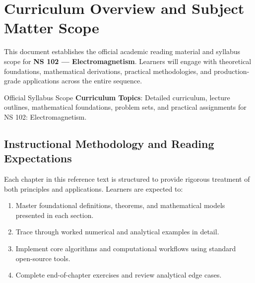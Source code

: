 \section{Curriculum Overview and Subject Matter Scope}

This document establishes the official academic reading material and syllabus scope for \textbf{NS 102 --- Electromagnetism}. Learners will engage with theoretical foundations, mathematical derivations, practical methodologies, and production-grade applications across the entire sequence.

\begin{InsightBox}{Official Syllabus Scope}
  \textbf{Curriculum Topics}: Detailed curriculum, lecture outlines, mathematical foundations, problem sets, and practical assignments for NS 102: Electromagnetism.
\end{InsightBox}

\subsection{Instructional Methodology and Reading Expectations}

Each chapter in this reference text is structured to provide rigorous treatment of both principles and applications. Learners are expected to:
\begin{enumerate}
  \item Master foundational definitions, theorems, and mathematical models presented in each section.
  \item Trace through worked numerical and analytical examples in detail.
  \item Implement core algorithms and computational workflows using standard open-source tools.
  \item Complete end-of-chapter exercises and review analytical edge cases.
\end{enumerate}

